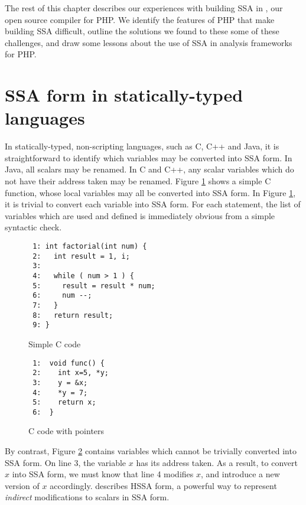 The rest of this chapter describes our experiences with building SSA
in \phc, our open source compiler for PHP.  We identify the features
of PHP that make building SSA difficult, outline the solutions we
found to these some of these challenges, and draw some lessons about
the use of SSA in analysis frameworks for PHP.



\section{SSA form in statically-typed languages}

In statically-typed, non-scripting languages, such as C, C++ and Java,
it is straightforward to identify which variables may be converted
into SSA form.  In Java, all scalars may be renamed.  In C and C++,
any scalar variables which do not have their address taken may be
renamed.  Figure \ref{c-easy-example} shows a simple C function, whose
local variables may all be converted into SSA form.  In Figure
\ref{c-easy-example}, it is trivial to convert each variable into SSA
form.  For each statement, the list of variables which are used and
defined is immediately obvious from a simple syntactic check.

\begin{figure}[thp]
\begin{verbatim}
 1: int factorial(int num) {
 2:   int result = 1, i;
 3:
 4:   while ( num > 1 ) {
 5:     result = result * num;
 6:     num --;
 7:   }
 8:   return result;
 9: }
\end{verbatim}
\caption{Simple C code}
\label{c-easy-example}
\end{figure}


\begin{figure}[thp]
\begin{verbatim}
 1:  void func() {
 2:    int x=5, *y;
 3:    y = &x;
 4:    *y = 7;
 5:    return x;
 6:  }
\end{verbatim}
\caption{C code with pointers}
\label{c-hard-example}
\end{figure}




By contrast, Figure \ref{c-hard-example} contains variables which
cannot be trivially converted into SSA form.  On line 3, the variable
$x$ has its address taken.  As a result, to convert $x$ into SSA form,
we must know that line 4 modifies $x$, and introduce a new version of
$x$ accordingly.   describes HSSA form, a powerful way to
represent \textit{indirect} modifications to scalars in SSA form.

